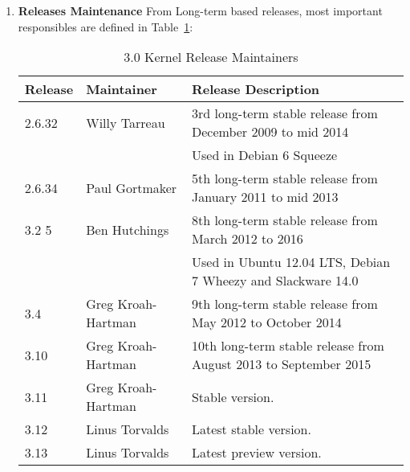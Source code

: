 \documentclass[11pt]{article}
\begin{document}
\begin{enumerate}
\item{\textbf{Releases Maintenance}}
From Long-term based releases, most important responsibles are defined in Table~\ref{tab:releasemaintainers}:
\begin{table}[H]
  \begin{center}
    \hspace*{-2cm}\begin{tabular}{ | l | l | l | }
    \hline
    Release & Maintainer & Release Description\\
    \hline
    \hline
    2.6.32 & Willy Tarreau & 3rd long-term stable release from December 2009 to mid 2014\\
    & & Used in Debian 6 Squeeze\\
    \hline
    2.6.34	& Paul Gortmaker & 5th long-term stable release from January 2011 to mid 2013\\
    \hline
    3.2	5  & Ben Hutchings	& 8th long-term stable release from March 2012 to 2016\\
    & & Used in Ubuntu 12.04 LTS, Debian 7 Wheezy and Slackware 14.0\\
    \hline
    3.4	   & Greg Kroah-Hartman & 9th long-term stable release from May 2012 to October 2014\\
    \hline
    3.10   & Greg Kroah-Hartman & 10th long-term stable release from August 2013 to September 2015\\
    \hline
    3.11   & Greg Kroah-Hartman	& Stable version.\\
    \hline
    3.12   & Linus Torvalds	& Latest stable version.\\
    \hline
    3.13   & Linus Torvalds	& Latest preview version.\\
    \hline
    \end{tabular}
    \caption{3.0 Kernel Release Maintainers}
    \label{tab:releasemaintainers}
  \end{center}
\end{table}
\end{enumerate}
\end{document}
